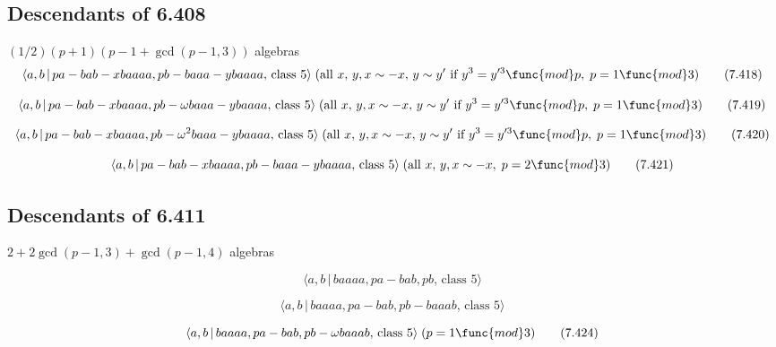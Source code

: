 \documentclass[10pt]{article}
\begin{document}
\subsection{Descendants of 6.408}

$(1/2)(p+1)(p-1+\gcd (p-1,3))$ algebras 
\begin{equation}
\langle a,b\,|\,pa-bab-xbaaaa,pb-baaa-ybaaaa,\,\text{class }5\rangle \;(%
\text{all }x,\,y,x\sim -x,\,y\sim y^{\prime }\text{ if }y^{3}=y^{\prime 3}%
\func{mod}p,\;p=1\func{mod}3)  \tag{7.418}
\end{equation}

\begin{equation}
\langle a,b\,|\,pa-bab-xbaaaa,pb-\omega baaa-ybaaaa,\,\text{class }5\rangle
\;(\text{all }x,\,y,x\sim -x,\,y \sim y^{\prime }\text{ if }y^3=y^{\prime 3}%
\func{mod}p,\;p=1\func{mod}3)  \tag{7.419}
\end{equation}

\begin{equation}
\langle a,b\,|\,pa-bab-xbaaaa,pb-\omega ^{2}baaa-ybaaaa,\,\text{class }%
5\rangle \;(\text{all }x,\,y,x\sim -x,\,y \sim y^{\prime }\text{ if }%
y^3=y^{\prime 3}\func{mod}p,\;p=1\func{mod}3)  \tag{7.420}
\end{equation}

\begin{equation}
\langle a,b\,|\,pa-bab-xbaaaa,pb-baaa-ybaaaa,\,\text{class }5\rangle \;(%
\text{all }x,\,y,x\sim -x,\;p=2\func{mod}3)  \tag{7.421}
\end{equation}

\subsection{Descendants of 6.411}

$2+2\gcd (p-1,3)+\gcd (p-1,4)$ algebras

\begin{equation}
\langle a,b\,|\,baaaa,pa-bab,pb,\,\text{class }5\rangle  \tag{7.422}
\end{equation}

\begin{equation}
\langle a,b\,|\,baaaa,pa-bab,pb-baaab,\,\text{class }5\rangle  \tag{7.423}
\end{equation}

\begin{equation}
\langle a,b\,|\,baaaa,pa-bab,pb-\omega baaab,\,\text{class }5\rangle \;(p=1%
\func{mod}3)  \tag{7.424}
\end{equation}
\end{document}
